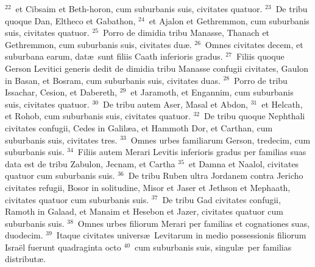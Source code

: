 ${}^{22}$~et Cibsaim et Beth-horon, cum suburbanis suis, civitates quatuor.
${}^{23}$~De tribu quoque Dan, Eltheco et Gabathon,
${}^{24}$~et Ajalon et Gethremmon, cum suburbanis suis, civitates quatuor.
${}^{25}$~Porro de dimidia tribu Manasse, Thanach et Gethremmon, cum suburbanis suis, civitates du\ae .
${}^{26}$~Omnes civitates decem, et suburbana earum, dat\ae\ sunt filiis Caath inferioris gradus.
${}^{27}$~Filiis quoque Gerson Levitici generis dedit de dimidia tribu Manasse confugii civitates, Gaulon in Basan, et Bosram, cum suburbanis suis, civitates duas.
${}^{28}$~Porro de tribu Issachar, Cesion, et Dabereth,
${}^{29}$~et Jaramoth, et Engannim, cum suburbanis suis, civitates quatuor.
${}^{30}$~De tribu autem Aser, Masal et Abdon,
${}^{31}$~et Helcath, et Rohob, cum suburbanis suis, civitates quatuor.
${}^{32}$~De tribu quoque Nephthali civitates confugii, Cedes in Galil\ae a, et Hammoth Dor, et Carthan, cum suburbanis suis, civitates tres.
${}^{33}$~Omnes urbes familiarum Gerson, tredecim, cum suburbanis suis.
${}^{34}$~Filiis autem Merari Levitis inferioris gradus per familias suas data est de tribu Zabulon, Jecnam, et Cartha
${}^{35}$~et Damna et Naalol, civitates quatuor cum suburbanis suis.
${}^{36}$~De tribu Ruben ultra Jordanem contra Jericho civitates refugii, Bosor in solitudine, Misor et Jaser et Jethson et Mephaath, civitates quatuor cum suburbanis suis.
${}^{37}$~De tribu Gad civitates confugii, Ramoth in Galaad, et Manaim et Hesebon et Jazer, civitates quatuor cum suburbanis suis.
${}^{38}$~Omnes urbes filiorum Merari per familias et cognationes suas, duodecim.
${}^{39}$~Itaque civitates univers\ae\ Levitarum in medio possessionis filiorum Isra\"el fuerunt quadraginta octo
${}^{40}$~cum suburbanis suis, singul\ae\ per familias distribut\ae .


